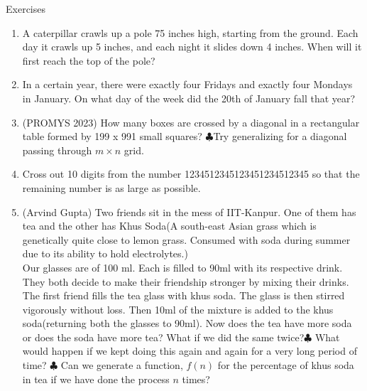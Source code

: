 \begin{xcb}{Exercises}
\begin{enumerate}
\item {} A caterpillar crawls up a pole 75 inches high, starting from the ground. Each day it crawls up 5 inches, and each night it slides down 4 inches. When will it first reach the top of the pole? 
\begin{hint}
\end{hint}
\item {} In a certain year, there were exactly four Fridays and exactly four Mondays in January. On what day of the week did the 20th of January fall that year? 
\begin{hint}
\end{hint}
\item {}(PROMYS 2023) How many boxes are crossed by a diagonal in a rectangular table formed by 199 x 991 small squares? $\clubsuit$Try generalizing for a diagonal passing through $m \times n$ grid.
\begin{hint}
\end{hint}
\item {} Cross out 10 digits from the number 1234512345123451234512345 so that the remaining number is as large as possible.
\begin{hint}
\end{hint}
\item {}(Arvind Gupta) Two friends sit in the mess of IIT-Kanpur. One of them has tea and the other has Khus Soda(A south-east Asian grass which is genetically quite close to lemon grass. Consumed with soda during summer due to its ability to hold electrolytes.)\\
Our glasses are of 100 ml. Each is filled to 90ml with its respective drink. They both decide to make their friendship stronger by mixing their drinks. The first friend fills the tea glass with khus soda. The glass is then stirred vigorously without loss. Then 10ml of the mixture is added to the khus soda(returning both the glasses to 90ml). Now does the tea have more soda or does the soda have more tea? What if we did the same twice?$\clubsuit$  What would happen if we kept doing this again and again for a very long period of time? $\clubsuit$ Can we generate a function, $f(n)$ for the percentage of khus soda in tea if we have done the process $n$ times?

\end{enumerate}
\end{xcb}
